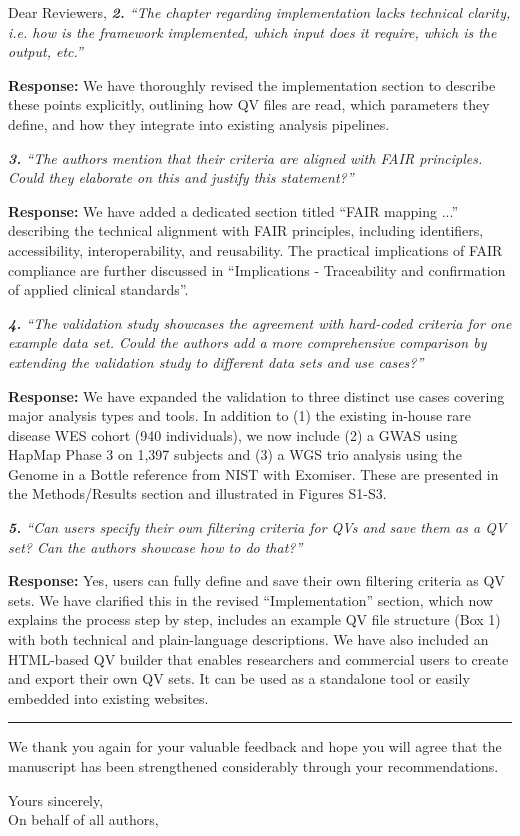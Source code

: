\documentclass[12pt,a4paper]{letter}
\begin{document}
\begin{letter}{Dear Reviewers,}
\textit{\textbf{2.} ``The chapter regarding implementation lacks technical clarity, i.e. how is the framework implemented, which input does it require, which is the output, etc.''}

\textbf{Response:} We have thoroughly revised the implementation section to describe these points explicitly, outlining how QV files are read, which parameters they define, and how they integrate into existing analysis pipelines.

\textit{\textbf{3.} ``The authors mention that their criteria are aligned with FAIR principles. Could they elaborate on this and justify this statement?''}

\textbf{Response:} We have added a dedicated section titled ``FAIR mapping ...'' describing the technical alignment with FAIR principles, including identifiers, accessibility, interoperability, and reusability. The practical implications of FAIR compliance are further discussed in ``Implications - Traceability and confirmation of applied clinical standards''.

\textit{\textbf{4.} ``The validation study showcases the agreement with hard-coded criteria for one example data set. Could the authors add a more comprehensive comparison by extending the validation study to different data sets and use cases?''}

\textbf{Response:} We have expanded the validation to three distinct use cases covering major analysis types and tools. In addition to (1) the existing in-house rare disease WES cohort (940 individuals), we now include (2) a GWAS using HapMap Phase 3 on 1,397 subjects and (3) a WGS trio analysis using the Genome in a Bottle reference from NIST with Exomiser. These are presented in the Methods/Results section and illustrated in Figures S1-S3.

\textit{\textbf{5.} ``Can users specify their own filtering criteria for QVs and save them as a QV set? Can the authors showcase how to do that?''}

\textbf{Response:} Yes, users can fully define and save their own filtering criteria as QV sets. We have clarified this in the revised ``Implementation'' section, which now explains the process step by step, includes an example QV file structure (Box 1) with both technical and plain-language descriptions. We have also included an HTML-based QV builder that enables researchers and commercial users to create and export their own QV sets. It can be used as a standalone tool or easily embedded into existing websites.

\noindent\rule{\textwidth}{0.4pt}

We thank you again for your valuable feedback and hope you will agree that the manuscript has been strengthened considerably through your recommendations.

\closing{Yours sincerely,\\
On behalf of all authors,}

\end{letter}
\end{document}
